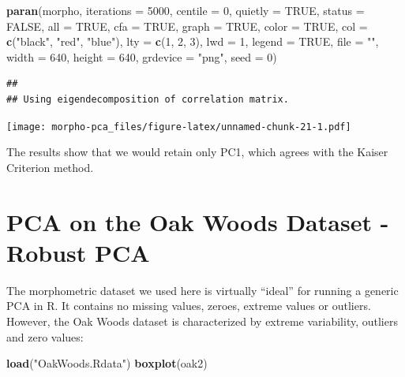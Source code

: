 \documentclass[]{article}
\newenvironment{Shaded}{\begin{snugshade}}{\end{snugshade}}
\newcommand{\DataTypeTok}[1]{\textcolor[rgb]{0.13,0.29,0.53}{#1}}
\newcommand{\DecValTok}[1]{\textcolor[rgb]{0.00,0.00,0.81}{#1}}
\newcommand{\KeywordTok}[1]{\textcolor[rgb]{0.13,0.29,0.53}{\textbf{#1}}}
\newcommand{\NormalTok}[1]{#1}
\newcommand{\OtherTok}[1]{\textcolor[rgb]{0.56,0.35,0.01}{#1}}
\newcommand{\StringTok}[1]{\textcolor[rgb]{0.31,0.60,0.02}{#1}}
\begin{document}
\begin{Shaded}
\begin{Highlighting}[]
\KeywordTok{paran}\NormalTok{(morpho, }\DataTypeTok{iterations =} \DecValTok{5000}\NormalTok{, }\DataTypeTok{centile =} \DecValTok{0}\NormalTok{, }\DataTypeTok{quietly =} \OtherTok{TRUE}\NormalTok{, }
    \DataTypeTok{status =} \OtherTok{FALSE}\NormalTok{, }\DataTypeTok{all =} \OtherTok{TRUE}\NormalTok{, }\DataTypeTok{cfa =} \OtherTok{TRUE}\NormalTok{, }\DataTypeTok{graph =} \OtherTok{TRUE}\NormalTok{, }\DataTypeTok{color =} \OtherTok{TRUE}\NormalTok{, }
    \DataTypeTok{col =} \KeywordTok{c}\NormalTok{(}\StringTok{"black"}\NormalTok{, }\StringTok{"red"}\NormalTok{, }\StringTok{"blue"}\NormalTok{), }\DataTypeTok{lty =} \KeywordTok{c}\NormalTok{(}\DecValTok{1}\NormalTok{, }\DecValTok{2}\NormalTok{, }\DecValTok{3}\NormalTok{), }\DataTypeTok{lwd =} \DecValTok{1}\NormalTok{, }\DataTypeTok{legend =} \OtherTok{TRUE}\NormalTok{, }
    \DataTypeTok{file =} \StringTok{""}\NormalTok{, }\DataTypeTok{width =} \DecValTok{640}\NormalTok{, }\DataTypeTok{height =} \DecValTok{640}\NormalTok{, }\DataTypeTok{grdevice =} \StringTok{"png"}\NormalTok{, }\DataTypeTok{seed =} \DecValTok{0}\NormalTok{)}
\end{Highlighting}
\end{Shaded}

\begin{verbatim}
## 
## Using eigendecomposition of correlation matrix.
\end{verbatim}

\texttt{[image: morpho-pca\_files/figure-latex/unnamed-chunk-21-1.pdf]}

The results show that we would retain only PC1, which agrees with the
Kaiser Criterion method.

\hypertarget{pca-on-the-oak-woods-dataset---robust-pca}{%
\section{PCA on the Oak Woods Dataset - Robust
PCA}\label{pca-on-the-oak-woods-dataset---robust-pca}}

The morphometric dataset we used here is virtually ``ideal'' for running
a generic PCA in R. It contains no missing values, zeroes, extreme
values or outliers. However, the Oak Woods dataset is characterized by
extreme variability, outliers and zero values:

\begin{Shaded}
\begin{Highlighting}[]
\KeywordTok{load}\NormalTok{(}\StringTok{"OakWoods.Rdata"}\NormalTok{)}
\KeywordTok{boxplot}\NormalTok{(oak2)}
\end{Highlighting}
\end{Shaded}
\end{document}
